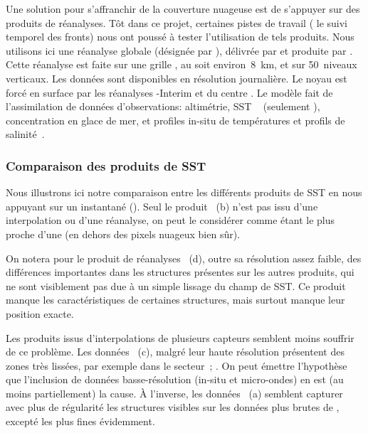 Une solution pour s'affranchir de la couverture nuageuse est de s'appuyer sur des produits de réanalyses.
Tôt dans ce projet, certaines pistes de travail ( le suivi temporel des fronts) nous ont poussé à tester l'utilisation de tels produits.
Nous utilisons ici une réanalyse globale (désignée par ), délivrée par  et produite par .
Cette réanalyse est faite sur une grille , au  soit environ~\qty{8}{\km}, et sur 50~niveaux verticaux. Les données sont disponibles en résolution journalière.
Le noyau  est forcé en surface par les réanalyses -Interim et  du centre .
Le modèle fait de l'assimilation de données d'observations: altimétrie, SST ~ (seulement ), concentration en glace de mer, et profiles in-situ de températures et profils de salinité~.

\subsubsection{Comparaison des produits de SST}

\begin{figure}
  \label{fig:comparaison-sst}
\end{figure}

Nous illustrons ici notre comparaison entre les différents produits de SST en nous appuyant sur un instantané ().
Seul le produit ~(b) n'est pas issu d'une interpolation ou d'une réanalyse, on peut le considérer comme étant le plus proche d'une  (en dehors des pixels nuageux bien sûr).

On notera pour le produit de réanalyses ~(d), outre sa résolution assez faible, des différences importantes dans les structures présentes sur les autres produits, qui ne sont visiblement pas due à un simple lissage du champ de SST.
Ce produit manque les caractéristiques de certaines structures, mais surtout manque leur position exacte.

Les produits issus d'interpolations de plusieurs capteurs semblent moins souffrir de ce problème.
Les données ~(c), malgré leur haute résolution présentent des zones très lissées, par exemple dans le secteur~; .
On peut émettre l'hypothèse que l'inclusion de données basse-résolution (in-situ et micro-ondes) en est (au moins partiellement) la cause.
À l'inverse, les données ~(a) semblent capturer avec plus de régularité les structures visibles sur les données plus brutes de , excepté les plus fines évidemment.

